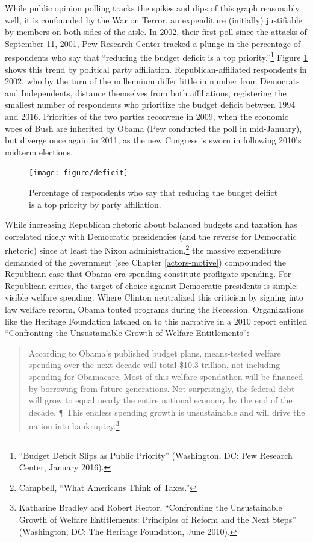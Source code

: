 \documentclass[12pt,oneside]{psthesis}
\begin{document}
While public opinion polling tracks the spikes and dips of this graph reasonably well, it is confounded by the War on Terror, an expenditure (initially) justifiable by members on both sides of the aisle.
In 2002, their first poll since the attacks of September 11, 2001, Pew Research Center tracked a plunge in the percentage of respondents who say that ``reducing the budget deficit is a top priority.''\footnote{``Budget Deficit Slips as Public Priority'' (Washington, DC: Pew Research Center, January 2016).}
Figure \ref{fig:deficit} shows this trend by political party affiliation.
Republican-affiliated respondents in 2002, who by the turn of the millennium differ little in number from Democrats and Independents, distance themselves from both affiliations, registering the smallest number of respondents who prioritize the budget deficit between 1994 and 2016.
Priorities of the two parties reconvene in 2009, when the economic woes of Bush are inherited by Obama (Pew conducted the poll in mid-January), but diverge once again in 2011, as the new Congress is sworn in following 2010's midterm elections.
\begin{figure}

{\centering \texttt{[image: figure/deficit]} 

}

\caption{Percentage of respondents who say that reducing the budget deifict is a top priority by party affiliation.}\label{fig:deficit}
\end{figure}
While increasing Republican rhetoric about balanced budgets and taxation has correlated nicely with Democratic presidencies (and the reverse for Democratic rhetoric) since at least the Nixon administration,\footnote{Campbell, ``What Americans Think of Taxes.''} the massive expenditure demanded of the government (see Chapter \ref{actors-motive}) compounded the Republican case that Obama-era spending constitute profligate spending.
For Republican critics, the target of choice against Democratic presidents is simple: visible welfare spending.
Where Clinton neutralized this criticism by signing into law welfare reform, Obama touted programs during the Recession.
Organizations like the Heritage Foundation latched on to this narrative in a 2010 report entitled ``Confronting the Unsustainable Growth of Welfare Entitlements'':
\begin{quote}
According to Obama's published budget plans, means-tested welfare spending over the next decade will total \$10.3 trillion, not including spending for Obamacare. Most of this welfare spendathon will be financed by borrowing from future generations. Not surprisingly, the federal debt will grow to equal nearly the entire national economy by the end of the decade. ¶ This endless spending growth is unsustainable and will drive the nation into bankruptcy.\footnote{Katharine Bradley and Robert Rector, ``Confronting the Unsustainable Growth of Welfare Entitlements: Principles of Reform and the Next Steps'' (Washington, DC: The Heritage Foundation, June 2010).}
\end{quote}
\end{document}
